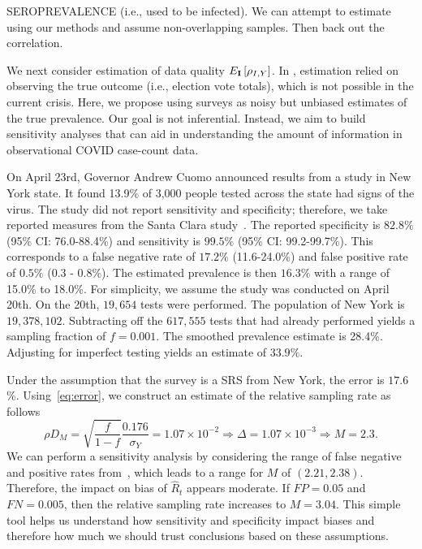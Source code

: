 \documentclass[11pt]{amsart}
\def\I{\bf I}
\begin{document}
SEROPREVALENCE (i.e., used to be infected).  We can attempt to estimate using our methods and assume non-overlapping samples.  Then back out the correlation.

We next consider estimation of data quality $E_{\I} \left[ \rho_{I,Y} \right]$. In \cite{Meng2018}, estimation relied on observing the true outcome (i.e., election vote totals), which  is not possible in the current crisis.  Here, we propose using surveys as noisy but unbiased estimates of the true prevalence. Our goal is not inferential. Instead, we aim to build sensitivity analyses that can aid in understanding the amount of information in observational COVID case-count data.

On April 23rd, Governor Andrew Cuomo announced results from a study in New York state.  It found 13.9\% of 3,000 people tested across the state had signs of the virus.  The study did not report sensitivity and specificity; therefore, we take reported measures from the Santa Clara study~\citep{Bendavid2020}.  The reported specificity is $82.8\%$ (95\% CI: 76.0-88.4\%) and sensitivity is $99.5\%$ (95\% CI: 99.2-99.7\%).  This corresponds to a false negative rate of $17.2\%$ (11.6-24.0\%) and false positive rate of $0.5\%$ (0.3 - 0.8\%).  The estimated prevalence is then $16.3\%$ with a range of 15.0\% to 18.0\%. For simplicity, we assume the study was conducted on April 20th. On the 20th, $19,654$ tests were performed. The population of New York is $19,378,102$.   Subtracting off the $617,555$ tests that had already performed yields a sampling fraction of $f = 0.001$.  The smoothed prevalence estimate is 28.4\%.  Adjusting for imperfect testing yields an estimate of $33.9\%$.

Under the assumption that the survey is a SRS from New York, the error is $17.6$\%.  Using~\eqref{eq:error}, we construct an estimate of the relative sampling rate as follows
\[
\rho D_M = \sqrt{\frac{f}{1-f}} \frac{\text{0.176}}{\sigma_Y} = 1.07 \times 10^{-2} \Rightarrow \Delta = 1.07 \times 10^{-3} \Rightarrow M = 2.3.
\]
We can perform a sensitivity analysis by considering the range of false negative and positive rates from~\cite{Bendavid2020}, which leads to a range for $M$ of $(2.21, 2.38)$.  Therefore, the impact on bias of $\hat R_t$ appears moderate.  If $FP = 0.05$ and $FN = 0.005$, then the relative sampling rate increases to $M=3.04$.  This simple tool helps us understand how sensitivity and specificity impact biases and  therefore how much we should trust conclusions based on these assumptions.
\end{document}
